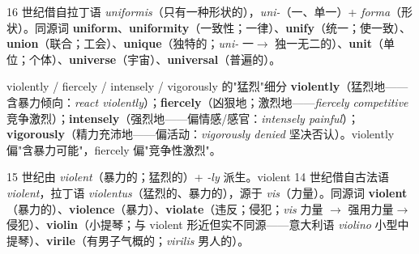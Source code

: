 \documentclass[../main.tex]{subfiles}
\begin{document}
\begin{origin}
16 世纪借自拉丁语 \textit{uniformis}（只有一种形状的），\textit{uni-}（一、单一）+ \textit{forma}（形状）。同源词 \textbf{uniform}、\textbf{uniformity}（一致性；一律）、\textbf{unify}（统一；使一致）、\textbf{union}（联合；工会）、\textbf{unique}（独特的；\textit{uni-} 一$\to$ 独一无二的）、\textbf{unit}（单位；个体）、\textbf{universe}（宇宙）、\textbf{universal}（普遍的）。
\end{origin}





\begin{gram}{violently / fiercely / intensely / vigorously 的"猛烈"细分}
\textbf{violently}（猛烈地——含暴力倾向：\textit{react violently}）；\textbf{fiercely}（凶狠地；激烈地——\textit{fiercely competitive} 竞争激烈）；\textbf{intensely}（强烈地——偏情感/感官：\textit{intensely painful}）；\textbf{vigorously}（精力充沛地——偏活动：\textit{vigorously denied} 坚决否认）。violently 偏"含暴力可能"，fiercely 偏"竞争性激烈"。
\end{gram}

\begin{origin}
15 世纪由 \textit{violent}（暴力的；猛烈的）+ \textit{-ly} 派生。violent 14 世纪借自古法语 \textit{violent}，拉丁语 \textit{violentus}（猛烈的、暴力的），源于 \textit{vis}（力量）。同源词 \textbf{violent}（暴力的）、\textbf{violence}（暴力）、\textbf{violate}（违反；侵犯；\textit{vis} 力量 $\to$ 强用力量$\to$侵犯）、\textbf{violin}（小提琴；与 violent 形近但实不同源——意大利语 \textit{violino} 小型中提琴）、\textbf{virile}（有男子气概的；\textit{virilis} 男人的）。
\end{origin}



\end{document}
